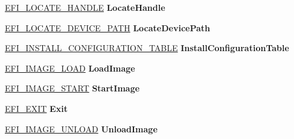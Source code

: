 \begin{DoxyCompactItemize}
\item 
\mbox{\label{struct_e_f_i___b_o_o_t___s_e_r_v_i_c_e_s_a32cc75ce1a89dfb6ddd1a443b089544a}} 
\hyperlink{_uefi_spec_8h_a5429fabf6cbd5f1a19da9f530b3169c9}{E\+F\+I\+\_\+\+L\+O\+C\+A\+T\+E\+\_\+\+H\+A\+N\+D\+LE} {\bfseries Locate\+Handle}
\item 
\mbox{\label{struct_e_f_i___b_o_o_t___s_e_r_v_i_c_e_s_aab75a25a0a2383f39f72344299eb7d6f}} 
\hyperlink{_uefi_spec_8h_a303e0e1389601ef48d62b1a2c4f9d779}{E\+F\+I\+\_\+\+L\+O\+C\+A\+T\+E\+\_\+\+D\+E\+V\+I\+C\+E\+\_\+\+P\+A\+TH} {\bfseries Locate\+Device\+Path}
\item 
\mbox{\label{struct_e_f_i___b_o_o_t___s_e_r_v_i_c_e_s_a057510bf5c6e8f30a824b175573f4963}} 
\hyperlink{_uefi_spec_8h_a433a7ef4b195848d42f0f3c2732bd61e}{E\+F\+I\+\_\+\+I\+N\+S\+T\+A\+L\+L\+\_\+\+C\+O\+N\+F\+I\+G\+U\+R\+A\+T\+I\+O\+N\+\_\+\+T\+A\+B\+LE} {\bfseries Install\+Configuration\+Table}
\item 
\mbox{\label{struct_e_f_i___b_o_o_t___s_e_r_v_i_c_e_s_ac413045580d2f78b60b34841a4d2e174}} 
\hyperlink{_uefi_spec_8h_a7ba493f6b693537a86a17e708cfed4d5}{E\+F\+I\+\_\+\+I\+M\+A\+G\+E\+\_\+\+L\+O\+AD} {\bfseries Load\+Image}
\item 
\mbox{\label{struct_e_f_i___b_o_o_t___s_e_r_v_i_c_e_s_a11c81bc2ee694af826770a7c350de511}} 
\hyperlink{_uefi_spec_8h_a13fe63294031748117705543b1072fdb}{E\+F\+I\+\_\+\+I\+M\+A\+G\+E\+\_\+\+S\+T\+A\+RT} {\bfseries Start\+Image}
\item 
\mbox{\label{struct_e_f_i___b_o_o_t___s_e_r_v_i_c_e_s_ac30733460ca67d3cfea0f43b6ea90624}} 
\hyperlink{_uefi_spec_8h_a3e5df8cc00a17673494d357d8358c61f}{E\+F\+I\+\_\+\+E\+X\+IT} {\bfseries Exit}
\item 
\mbox{\label{struct_e_f_i___b_o_o_t___s_e_r_v_i_c_e_s_a563fc2dd1e17f625597f434802db4e88}} 
\hyperlink{_uefi_spec_8h_a334c8dd4b1694db0ca13184bc07079f3}{E\+F\+I\+\_\+\+I\+M\+A\+G\+E\+\_\+\+U\+N\+L\+O\+AD} {\bfseries Unload\+Image}
\item 

\end{DoxyCompactItemize}
